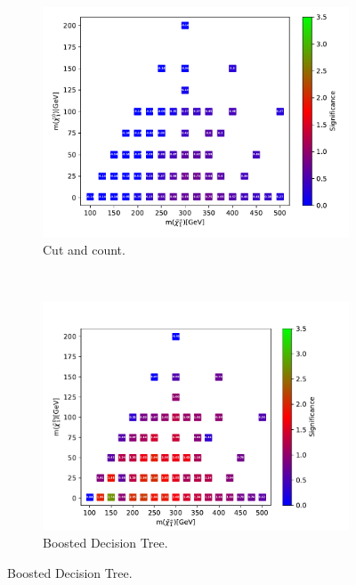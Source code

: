 \begin{figure}[H]
    \centering
    \begin{subfigure}[t!]{0.49\textwidth}
    \includegraphics[width = \textwidth]{Figures/Significances/significanceCutandCount_WW_all.pdf}
    \caption{Cut and count.}
        \label{fig:signAllWWcandc}
    \end{subfigure}
    \\
    \begin{subfigure}[t!]{0.49\textwidth}
    \includegraphics[width = \textwidth]{Figures/Significances/significance_BDT_WW_All_level.pdf}
    \caption{Boosted Decision Tree.}
        \label{fig:signAllWWBDT}
    \end{subfigure}      

\end{figure}
